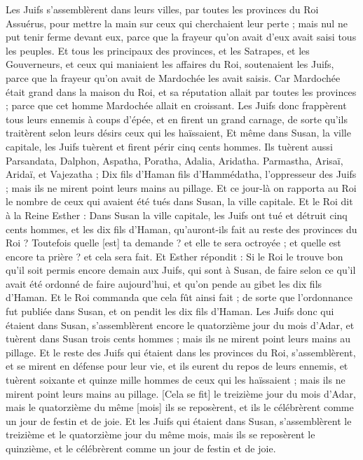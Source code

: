 \begin{multicols}{2}
Les Juifs s'assemblèrent dans leurs villes, par toutes les provinces du Roi Assuérus, pour mettre la main sur ceux qui cherchaient leur perte ; mais nul ne put tenir ferme devant eux, parce que la frayeur qu'on avait d'eux avait saisi tous les peuples.
Et tous les principaux des provinces, et les Satrapes, et les Gouverneurs, et ceux qui maniaient les affaires du Roi, soutenaient les Juifs, parce que la frayeur qu'on avait de Mardochée les avait saisis.
Car Mardochée était grand dans la maison du Roi, et sa réputation allait par toutes les provinces ; parce que cet homme Mardochée allait en croissant.
Les Juifs donc frappèrent tous leurs ennemis à coups d'épée, et en firent un grand carnage, de sorte qu'ils traitèrent selon leurs désirs ceux qui les haïssaient,
Et même dans Susan, la ville capitale, les Juifs tuèrent et firent périr cinq cents hommes.
Ils tuèrent aussi Parsandata, Dalphon, Aspatha,
Poratha, Adalia, Aridatha.
Parmastha, Arisaï, Aridaï, et Vajezatha ;
Dix fils d'Haman fils d'Hammédatha, l'oppresseur des Juifs ; mais ils ne mirent point leurs mains au pillage.
Et ce jour-là on rapporta au Roi le nombre de ceux qui avaient été tués dans Susan, la ville capitale.
Et le Roi dit à la Reine Esther : Dans Susan la ville capitale, les Juifs ont tué et détruit cinq cents hommes, et les dix fils d'Haman, qu'auront-ils fait au reste des provinces du Roi ? Toutefois quelle [est] ta demande ? et elle te sera octroyée ; et quelle est encore ta prière ? et cela sera fait.
Et Esther répondit : Si le Roi le trouve bon qu'il soit permis encore demain aux Juifs, qui sont à Susan, de faire selon ce qu'il avait été ordonné de faire aujourd'hui, et qu'on pende au gibet les dix fils d'Haman.
Et le Roi commanda que cela fût ainsi fait ; de sorte que l'ordonnance fut publiée dans Susan, et on pendit les dix fils d'Haman.
Les Juifs donc qui étaient dans Susan, s'assemblèrent encore le quatorzième jour du mois d'Adar, et tuèrent dans Susan trois cents hommes ; mais ils ne mirent point leurs mains au pillage.
Et le reste des Juifs qui étaient dans les provinces du Roi, s'assemblèrent, et se mirent en défense pour leur vie, et ils eurent du repos de leurs ennemis, et tuèrent soixante et quinze mille hommes de ceux qui les haïssaient ; mais ils ne mirent point leurs mains au pillage.
[Cela se fit] le treizième jour du mois d'Adar, mais le quatorzième du même [mois] ils se reposèrent, et ils le célébrèrent comme un jour de festin et de joie.
Et les Juifs qui étaient dans Susan, s'assemblèrent le treizième et le quatorzième jour du même mois, mais ils se reposèrent le quinzième, et le célébrèrent comme un jour de festin et de joie.

\end{multicols}
